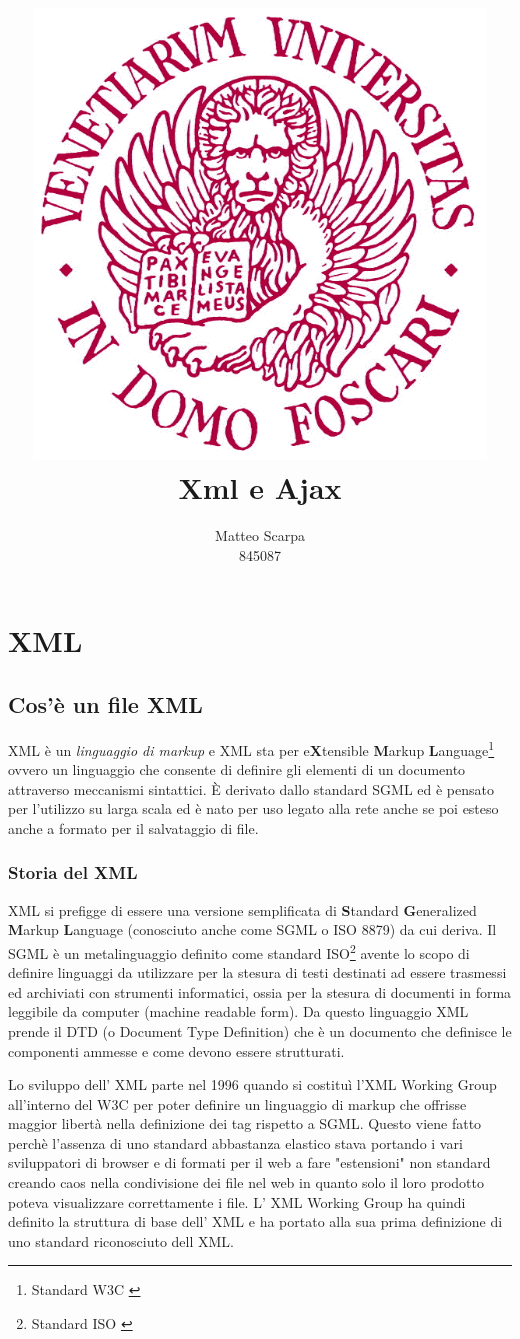 \documentclass{report}
\title{\includegraphics[width=120mm]{logo-unive.png} \\ Xml e Ajax}
\author{Matteo Scarpa\\ 845087}
\date{}
\begin{document}
\maketitle
\tableofcontents

\chapter{XML}
\section{Cos'è un file XML}
XML è un \textit{linguaggio di markup} e XML sta per e\textbf{X}tensible \textbf{M}arkup \textbf{L}anguage\footnote{Standard W3C \cite{site:w3cxml}} ovvero un linguaggio che consente di definire gli elementi di un documento attraverso meccanismi sintattici.
È derivato dallo standard SGML  ed è pensato per l'utilizzo su larga scala ed è nato per uso legato alla rete anche se poi esteso anche a formato per il salvataggio di file.

\subsection{Storia del XML}
XML si prefigge di essere una versione semplificata di \textbf{S}tandard \textbf{G}eneralized \textbf{M}arkup \textbf{L}anguage (conosciuto anche come SGML o ISO 8879) da cui deriva.
Il SGML è un metalinguaggio definito come standard ISO\footnote{Standard ISO \cite{site:isosgml}}  avente lo scopo di definire linguaggi da utilizzare per la stesura di testi destinati ad essere trasmessi ed archiviati con strumenti informatici, ossia per la stesura di documenti in forma leggibile da computer (machine readable form). Da questo linguaggio XML prende il DTD (o Document Type Definition) che è un documento che definisce le componenti ammesse e come devono essere strutturati.

Lo sviluppo dell' XML parte nel 1996 quando si costituì l’XML Working Group all'interno del W3C per poter definire un linguaggio di markup che offrisse maggior libertà nella definizione dei tag rispetto a SGML. Questo viene fatto perchè l'assenza di uno standard abbastanza elastico stava portando i vari sviluppatori di browser e di formati per il web a fare "estensioni" non standard creando caos nella condivisione dei file nel web in quanto solo il loro prodotto poteva visualizzare correttamente i file.
L' XML Working Group ha quindi definito la struttura di base dell' XML e ha portato alla sua prima definizione di uno standard riconosciuto dell XML. 
\end{document}
